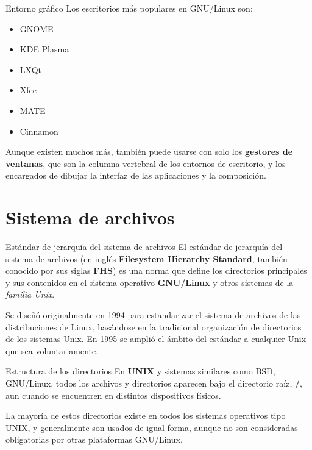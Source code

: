 \begin{frame}[c]{Entorno gráfico}
  Los escritorios más populares en GNU/Linux son:

  \begin{itemize}
    \item GNOME
    \item KDE Plasma
    \item LXQt
    \item Xfce
    \item MATE
    \item Cinnamon
  \end{itemize}

  Aunque existen muchos más, también puede usarse con solo los
  \textbf{gestores de ventanas}, que son la columna vertebral de los entornos
  de escritorio, y los encargados de dibujar la interfaz de las aplicaciones
  y la composición.
\end{frame}

\section{Sistema de archivos}

\begin{frame}[c]{Estándar de jerarquía del sistema de archivos}
  El estándar de jerarquía del sistema de archivos (en inglés \textbf{Filesystem
  Hierarchy Standard}, también conocido por sus siglas \textbf{FHS}) es una
  norma que define los directorios principales y sus contenidos en el sistema
  operativo \textbf{GNU/Linux} y otros sistemas de la \emph{familia Unix}.

  \vspace{\baselineskip}
  Se diseñó originalmente en 1994 para estandarizar el sistema de archivos de
  las distribuciones de Linux, basándose en la tradicional organización de
  directorios de los sistemas Unix. En 1995 se amplió el ámbito del estándar
  a cualquier Unix que sea voluntariamente.
\end{frame}

\begin{frame}[c]{Estructura de los directorios}
  En \textbf{UNIX} y sistemas similares como BSD, GNU/Linux, todos los
  archivos y directorios aparecen bajo el directorio raíz, \textbf{/},
  aun cuando se encuentren en distintos dispositivos físicos.

  \vspace{\baselineskip}
  La mayoría de estos directorios existe en todos los sistemas operativos
  tipo UNIX, y generalmente son usados de igual forma, aunque no son
  consideradas obligatorias por otras plataformas GNU/Linux.
\end{frame}

